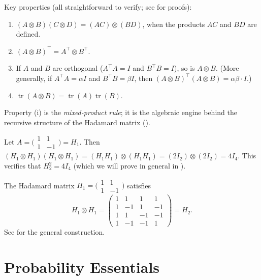 Key properties (all straightforward to verify; see
\citealp[Chapter~4]{horn2012matrix} for proofs):
\begin{enumerate}[label=(\roman*)]
  \item $(A \otimes B)(C \otimes D) = (AC) \otimes (BD)$, when the
        products $AC$ and $BD$ are defined.
  \item $(A \otimes B)^\top = A^\top \otimes B^\top$.
  \item If $A$ and $B$ are orthogonal ($A^\top A = I$ and $B^\top B = I$),
        so is $A \otimes B$. (More generally, if $A^\top A = \alpha I$
        and $B^\top B = \beta I$, then
        $(A \otimes B)^\top(A \otimes B) = \alpha\beta \cdot I$.)
  \item $\operatorname{tr}(A \otimes B) = \operatorname{tr}(A)\operatorname{tr}(B)$.
\end{enumerate}

Property (i) is the \emph{mixed-product rule}; it is the algebraic engine
behind the recursive structure of the Hadamard matrix ().

\begin{example}\label{ex:mixed-product}
Let $A = \bigl(\begin{smallmatrix} 1 & 1 \\ 1 & -1 \end{smallmatrix}\bigr) = H_1$.
Then $(H_1 \otimes H_1)(H_1 \otimes H_1) = (H_1 H_1) \otimes (H_1 H_1)
= (2I_2) \otimes (2I_2) = 4I_4$. This verifies that $H_2^2 = 4I_4$
(which we will prove in general in ).
\end{example}

\begin{example}\label{ex:kronecker-2x2}
The Hadamard matrix $H_1 = \bigl(\begin{smallmatrix} 1 & 1 \\ 1 & -1
\end{smallmatrix}\bigr)$ satisfies
\[
  H_1 \otimes H_1 =
  \begin{pmatrix}
    1 & 1 & 1 & 1 \\
    1 & -1 & 1 & -1 \\
    1 & 1 & -1 & -1 \\
    1 & -1 & -1 & 1
  \end{pmatrix} = H_2.
\]
See  for the general construction.
\end{example}


\section{Probability Essentials}\label{sec:prob-essentials}

